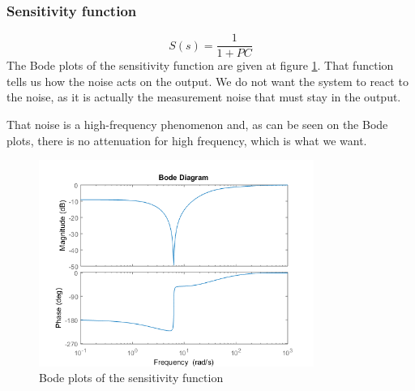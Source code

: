 \subsubsection{Sensitivity function}
$$
S(s) = \dfrac{1}{1 + PC}
$$
The Bode plots of the sensitivity function are given at figure \ref{fig:sensitivity}. That function tells us how the noise acts on the output. We do not want the system to react to the noise, as it is actually the measurement noise that must stay in the output.\par
That noise is a high-frequency phenomenon and, as can be seen on the Bode plots, there is no attenuation for high frequency, which is what we want.
\begin{figure}[H]
    \centering
    \includegraphics[width=0.8\textwidth]{resources/png/sensitivity.png}
    \caption{Bode plots of the sensitivity function}
    \label{fig:sensitivity}
\end{figure}

